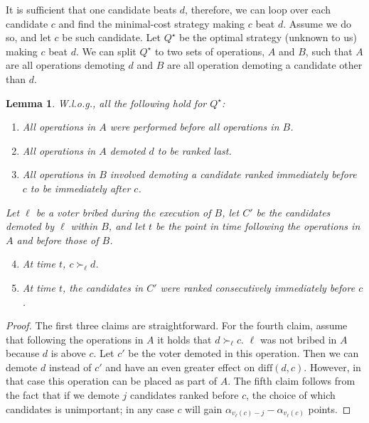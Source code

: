 \documentclass[letterpaper]{article} %
\newtheorem{lemma}{Lemma}
\newcommand{\diff}{\mathrm{diff}}
\begin{document}
It is sufficient that one candidate beats $d$, therefore, we can loop over each candidate $c$ and find the minimal-cost strategy making $c$ beat $d$.
Assume we do so, and let $c$ be such candidate. Let $Q^\star$ be the optimal strategy (unknown to us) making $c$ beat $d$. We can split $Q^\star$ to two sets of operations, $A$ and $B$, such that $A$ are all operations demoting $d$ and $B$ are all operation demoting a candidate other than $d$. 

\begin{lemma}
W.l.o.g., all the following hold for $Q^\star$:
\begin{enumerate}
    \item All operations in $A$ were performed before all operations in $B$.
    \item All operations in $A$ demoted $d$ to be ranked last.
    \item All operations in $B$ involved demoting a candidate ranked immediately before $c$ to be immediately after $c$.
    \end{enumerate}
Let $\ell$ be a voter bribed during the execution of $B$, let $C'$ be the candidates demoted by $\ell$ within $B$, and let $t$ be the point in time following the operations in $A$ and before those of $B$.
    \begin{enumerate}
    \setcounter{enumi}{3}
    \item At time $t$, $c \succ_\ell d$.
    \item At time $t$, the candidates in $C'$ were ranked consecutively  immediately before $c$. 
\end{enumerate}
\end{lemma}
\begin{proof}
The first three claims are straightforward.
For the fourth claim, 
assume that following the operations in $A$ it holds that $d \succ_{\ell} c$. $\ell$ was not bribed in $A$ because $d$ is above $c$. Let $c'$ be the voter demoted in this operation. Then we can demote $d$ instead of $c'$ and have an even greater effect on $\diff(d, c)$. However, in that case this operation can be placed as part of $A$. The fifth claim follows from the fact that if we demote $j$ candidates ranked before $c$, the choice of which  candidates is unimportant; in any case $c$ will gain $\alpha_{v_\ell(c) - j} - \alpha_{v_\ell(c)}$ points.
\end{proof}

\end{document}
